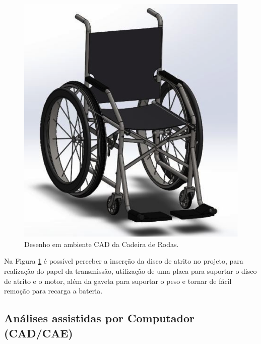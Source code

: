 \begin{figure}[!htb]
    \begin{center}
        \includegraphics{figuras/first_cad_chair.png}
    \end{center}
    \caption{Desenho em ambiente CAD da Cadeira de Rodas.}
    \label{fig:first_cad_chair}
\end{figure}

Na Figura \ref{fig:first_cad_chair} é possível perceber a inserção da disco de
atrito no projeto, para realização do papel da transmissão, utilização de uma
placa para suportar o disco de atrito e o motor, além da gaveta para suportar o
peso e tornar de fácil remoção para recarga a bateria.

\subsection{Análises assistidas por Computador (CAD/CAE)}

